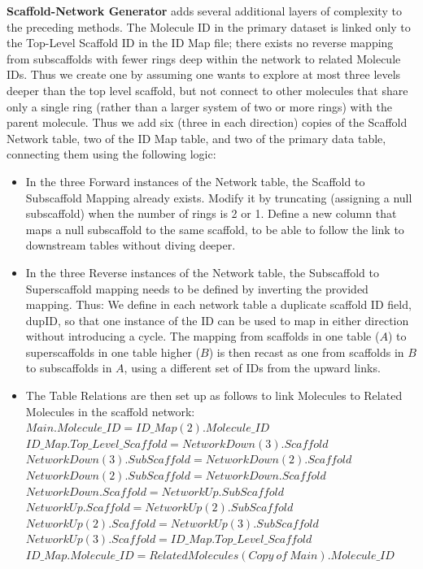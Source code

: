 \documentclass[journal=jacsat,manuscript=article]{achemso}
\begin{document}
{\bf Scaffold-Network Generator} adds several additional layers of
complexity to the preceding methods. The Molecule ID in the primary
dataset is linked only to the Top-Level Scaffold ID in the ID Map
file; there exists no reverse mapping from subscaffolds with fewer
rings deep within the network to related Molecule IDs. Thus we create
one by assuming one wants to explore at most three levels deeper than
the top level scaffold, but not connect to other molecules that share
only a single ring (rather than a larger system of two or more rings)
with the parent molecule. Thus we add six (three in each direction)
copies of the Scaffold Network table, two of the ID Map table, and two
of the primary data table, connecting them using the following logic:
\begin{itemize}
\item In the three Forward instances of the Network table, the
  Scaffold to Subscaffold Mapping already exists. Modify it by
  truncating (assigning a null subscaffold) when the number of rings
  is 2 or 1.  \subitem Define a new column that maps a null
  subscaffold to the same scaffold, to be able to follow the link to
  downstream tables without diving deeper.
\item In the three Reverse instances of the Network table, the
  Subscaffold to Superscaffold mapping needs to be defined by
  inverting the provided mapping. Thus: \subitem We define in each
  network table a duplicate scaffold ID field, dupID, so that one
  instance of the ID can be used to map in either direction without
  introducing a cycle.  \subitem The mapping from scaffolds in one
  table ($A$) to superscaffolds in one table higher ($B$) is then
  recast as one from scaffolds in $B$ to subscaffolds in $A$, using a
  different set of IDs from the upward links.
\item The Table Relations are then set up as follows to link Molecules
  to Related Molecules in the scaffold network: \subitem
  $Main.Molecule\_ID = ID\_Map(2).Molecule\_ID$ \subitem
  $ID\_Map.Top\_Level\_Scaffold = NetworkDown(3).Scaffold$ \subitem
  $NetworkDown(3).SubScaffold = NetworkDown(2).Scaffold$ \subitem
  $NetworkDown(2).SubScaffold = NetworkDown.Scaffold$ \subitem
  $NetworkDown.Scaffold = NetworkUp.SubScaffold$ \subitem
  $NetworkUp.Scaffold = NetworkUp(2).SubScaffold$ \subitem
  $NetworkUp(2).Scaffold = NetworkUp(3).SubScaffold$ \subitem
  $NetworkUp(3).Scaffold = ID\_Map.Top\_Level\_Scaffold$ \subitem
  $ID\_Map.Molecule\_ID = Related
  Molecules(Copy~of~Main).Molecule\_ID$
\end{itemize}   
\end{document}
